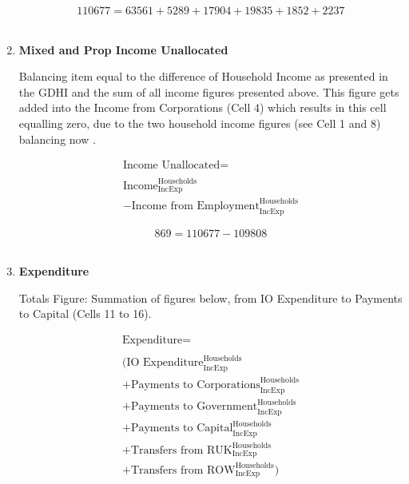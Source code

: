 \begin{enumerate}
\begin{equation} \nonumber
110677 = 63561+5289+17904+19835+1852+2237
\end{equation}\\


\item \textbf {Mixed and Prop Income Unallocated}

Balancing item equal to the difference of Household Income as presented in the GDHI \cite{ONS2012} and the sum of all income figures presented above. This figure gets added into the Income from Corporations (Cell 4) which results in this cell equalling zero, due to the two household income figures (see Cell 1 and 8) balancing now \cite{ONS2011b}.

\begin{equation}
\begin{split}
\text{Income Unallocated} =  \\ \\
\text{Income}^\text{Households}_\text{IncExp}\\
-\text{Income from Employment}^\text{Households}_\text{IncExp}
\end{split} \label{eq:2.5.13}
\end{equation}


\begin{equation} \nonumber
869 = 110677-109808
\end{equation}\\


\pagebreak

\item \textbf {Expenditure}

Totals Figure: Summation of figures below, from IO Expenditure to Payments to Capital (Cells 11 to 16).

\begin{equation}
\begin{split}
\text{Expenditure} =  \\ \\
(\text{IO Expenditure}^\text{Households}_\text{IncExp}\\
+\text{Payments to Corporations}^\text{Households}_\text{IncExp}\\
+\text{Payments to Government}^\text{Households}_\text{IncExp}\\
+\text{Payments to Capital}^\text{Households}_\text{IncExp}\\
+\text{Transfers from RUK}^\text{Households}_\text{IncExp}\\
+\text{Transfers from ROW}^\text{Households}_\text{IncExp})
\end{split} \label{eq:2.5.14}
\end{equation}


\end{enumerate}
